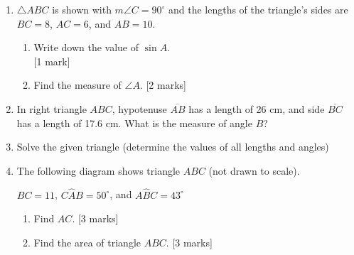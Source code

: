 \documentclass[12pt, twoside]{article}
\begin{document}
\begin{enumerate}
\item $\triangle ABC$ is shown with $m\angle C=90^\circ$ and the lengths of the triangle's sides are $BC=8$, $AC=6$, and $AB=10$.
  \begin{multicols}{2}
        \begin{enumerate}
        \item Write down the value of $\sin A$.  \\ \hfill [1 mark]\vspace{1cm}
        \item Find the measure of $\angle A$.  \hfill [2 marks] \vspace{1cm}
      \end{enumerate}
    \end{multicols}

\item In right triangle $ABC$, hypotenuse $\overline{AB}$ has a length of 26 cm, and side $\overline{BC}$ has a length of 17.6 cm. What is the measure of angle $B$?
   
\item Solve the given triangle (determine the values of all lengths and angles)
  \begin{center}
    \end{center} \vspace{1cm}

   \newpage

\item The following diagram shows triangle $ABC$ (not drawn to scale).
  \begin{center}
    \end{center} 
    $BC=11$, $C\hat{A}B=50^\circ$, and $A\hat{B}C=43^\circ$
    \begin{enumerate}
      \item Find $AC$. \hfill [3 marks]
      \item Find the area of triangle $ABC$. \hfill [3 marks]
    \end{enumerate}


\end{enumerate}
\end{document}
